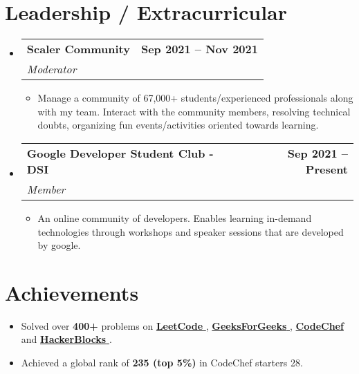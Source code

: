 \documentclass[letterpaper,11pt]{article}
\makeatletter
\newcommand{\resumeItem}[1]{
  \item\small{
    {#1 \vspace{-2pt}}
  }
}
\newcommand{\resumeSubheading}[4]{
  \vspace{-2pt}\item
    \begin{tabular*}{1.0\textwidth}[t]{l@{\extracolsep{\fill}}r}
      \textbf{#1} & \textbf{\small #2} \\
      \textit{\small#3} & \textit{\small #4} \\
    \end{tabular*}\vspace{-7pt}
}
\newcommand{\resumeSubHeadingListStart}{\begin{itemize}[leftmargin=0.0in, label={}]}
\newcommand{\resumeSubHeadingListEnd}{\end{itemize}}
\newcommand{\resumeItemListStart}{\begin{itemize}}
\newcommand{\resumeItemListEnd}{\end{itemize}\vspace{-5pt}}
\makeatother
\begin{document}
\section{Leadership / Extracurricular}
    \resumeSubHeadingListStart
    \resumeSubheading{Scaler Community}{Sep 2021 -- Nov 2021}{Moderator}{}
        \resumeItemListStart
            \resumeItem{Manage a community of 67,000+ students/experienced professionals along with my team. Interact with the community members, resolving technical doubts, organizing fun events/activities oriented towards learning.}
            
        \resumeItemListEnd     
         \resumeSubheading{Google Developer Student Club - DSI}{Sep 2021 -- Present}{Member}{}
        \resumeItemListStart
            \resumeItem{An online community of developers. Enables learning in-demand technologies through workshops and speaker sessions that are developed by google.}
        \resumeItemListEnd
        \resumeSubHeadingListEnd
            
       
       
\section{Achievements}
    \resumeItemListStart
        \resumeItem {Solved over \textbf{400+} problems on 
        {\href{https://leetcode.com/adarsh50/}{\textbf{LeetCode }\faExternalLink}},
        {\href{https://auth.geeksforgeeks.org/user/adarsh500/profile}{\textbf{GeeksForGeeks \faExternalLink}}},
        {\href{https://www.codechef.com/users/adarsh500}{\textbf{CodeChef \faExternalLink}}} and 
        {\href{https://hack.codingblocks.com/app/users/274354}{\textbf{HackerBlocks \faExternalLink}}}.}
        \vspace{-5pt}
        \resumeItem {Achieved a global rank of \textbf{235 (top 5\%)} in CodeChef starters 28.}
    \resumeItemListEnd
    
\end{document}
